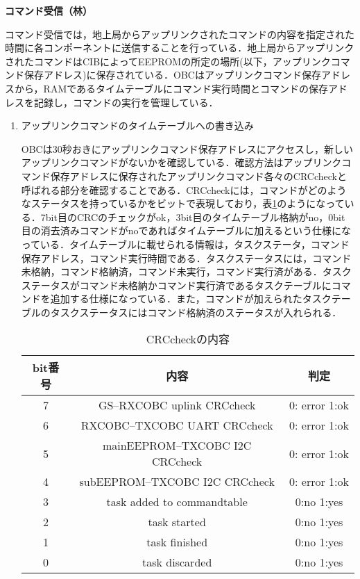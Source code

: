 \textbf{コマンド受信（林）}\par
コマンド受信では，地上局からアップリンクされたコマンドの内容を指定された時間に各コンポーネントに送信することを行っている．地上局からアップリンクされたコマンドはCIBによってEEPROMの所定の場所(以下，アップリンクコマンド保存アドレス)に保存されている．OBCはアップリンクコマンド保存アドレスから，RAMであるタイムテーブルにコマンド実行時間とコマンドの保存アドレスを記録し，コマンドの実行を管理している．
\begin{enumerate}
	\item アップリンクコマンドのタイムテーブルへの書き込み\par
	OBCは30秒おきにアップリンクコマンド保存アドレスにアクセスし，新しいアップリンクコマンドがないかを確認している．確認方法はアップリンクコマンド保存アドレスに保存されたアップリンクコマンド各々のCRCcheckと呼ばれる部分を確認することである．CRCcheckには，コマンドがどのようなステータスを持っているかをビットで表現しており，表\ref{crccheck_contents}のようになっている．7bit目のCRCのチェックがok，3bit目のタイムテーブル格納がno，0bit目の消去済みコマンドがnoであればタイムテーブルに加えるという仕様になっている．タイムテーブルに載せられる情報は，タスクステータ，コマンド保存アドレス，コマンド実行時間である．タスクステータスには，コマンド未格納，コマンド格納済，コマンド未実行，コマンド実行済がある．タスクステータスがコマンド未格納かコマンド実行済であるタスクテーブルにコマンドを追加する仕様になっている．また，コマンドが加えられたタスクテーブルのタスクステータスにはコマンド格納済のステータスが入れられる．
	\begin{table}[hbtp]
		\caption{CRCcheckの内容}
		\label{crccheck_contents}
		\centering
		\begin{tabular}{ccc}
			\hline
			bit番号  & 内容  &  判定  \\
			\hline \hline
			7  & GS--RXCOBC uplink CRCcheck  & 0: error 1:ok \\
			6  & RXCOBC--TXCOBC UART  CRCcheck   & 0: error 1:ok \\
			5  & mainEEPROM--TXCOBC  I2C CRCcheck  & 0: error 1:ok \\
			4  & subEEPROM--TXCOBC  I2C CRCcheck  & 0: error 1:ok \\
			3  & task added to commandtable  & 0:no  1:yes  \\
			2  & task started   & 0:no  1:yes \\
			1  & task finished  & 0:no  1:yes \\
			0  & task discarded  & 0:no  1:yes \\
			\hline
		\end{tabular}

\end{table}
\end{enumerate}
